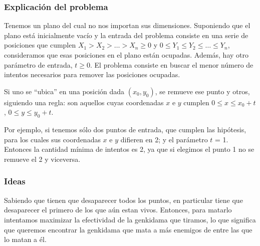 \subsubsection{Explicación del problema}
Tenemos un plano del cual no nos importan sus dimensiones. Suponiendo que el plano está inicialmente vacío y la entrada del problema consiste en una serie de posiciones que cumplen $X_1 > X_2 > … > X_n \geq 0$ y $0 \leq Y_1 \leq Y_2 \leq … \leq Y_n$, consideramos que esas posiciones en el plano están ocupadas. Además, hay otro parámetro de entrada, $t \geq 0$.
El problema consiste en buscar el menor número de intentos necesarios para remover las posiciones ocupadas. 

Si uno se “ubica” en una posición dada $(x_0, y_0)$, se remueve ese punto y otros, siguiendo una regla: son aquellos cuyas coordenadas $x$ e $y$ cumplen $0 \leq x \leq x_0 + t$, $0 \leq y \leq y_0 + t$.

Por ejemplo, si tenemos sólo dos puntos de entrada, que cumplen las hipótesis, para los cuales sus coordenadas $x$ e $y$ difieren en 2; y el parámetro $t$ = 1. Entonces la cantidad mínima de intentos es 2, ya que si elegimos el punto 1 no se remueve el 2 y viceversa.

\subsubsection{Ideas}

Sabiendo que tienen que desaparecer todos los puntos, en particular tiene que desaparecer el primero de los que aún estan vivos. Entonces, para matarlo intentamos maximizar la efectividad de la genkidama que tiramos, lo que significa que queremos encontrar la genkidama que mata a más enemigos de entre las que lo matan a él.

